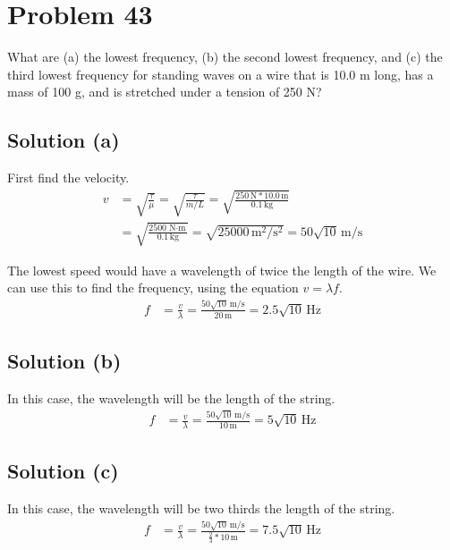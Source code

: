 \documentclass[12pt]{article}
\begin{document}
    \section{Problem 43}
        What are (a) the lowest frequency, (b) the second lowest frequency, and (c) the third lowest frequency for standing waves on a wire that is 10.0 m long, has a mass of 100 g, and is stretched under a tension of 250 N?

        \subsection{Solution (a)}
            First find the velocity.
            \begin{align}
                v   &=  \sqrt{\frac{\tau}{\mu}}
                    =   \sqrt{\frac{\tau}{m/L}}
                    =   \sqrt{\frac{250\,\unit{\newton} * 10.0\,\unit{\meter}}{0.1\,\unit{\kilo\gram}}}\\
                    &=  \sqrt{\frac{2500\,\unit{\newton\cdot\meter}}{0.1\,\unit{\kilo\gram}}}
                    =   \sqrt{25000\,\unit{\meter^2/\second^2}}
                    =   50\sqrt{10}\,\unit{\meter/\second}
            \end{align}

            The lowest speed would have a wavelength of twice the length of the wire.
            We can use this to find the frequency, using the equation $v = \lambda f$.
            \begin{align}
                f   &=  \frac{v}{\lambda}
                    =   \frac{50\sqrt{10}\,\unit{\meter/\second}}{20\,\unit{\meter}}
                    =   \boxed{2.5\sqrt{10}\,\unit{\hertz}}
            \end{align}

        \subsection{Solution (b)}
            In this case, the wavelength will be the length of the string.
            \begin{align}
                f   &=  \frac{v}{\lambda}
                    =   \frac{50\sqrt{10}\,\unit{\meter/\second}}{10\,\unit{\meter}}
                    =   \boxed{5\sqrt{10}\,\unit{\hertz}}
            \end{align}
            
        \subsection{Solution (c)}
            In this case, the wavelength will be two thirds the length of the string.
            \begin{align}
                f   &=  \frac{v}{\lambda}
                    =   \frac{50\sqrt{10}\,\unit{\meter/\second}}{\frac{2}{3}*10\,\unit{\meter}}
                    =   \boxed{7.5\sqrt{10}\,\unit{\hertz}}
            \end{align}
\end{document}
